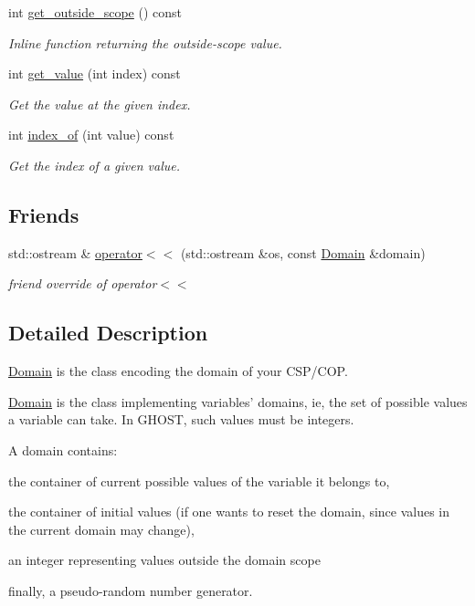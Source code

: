 \begin{DoxyCompactItemize}
int \hyperlink{classghost_1_1Domain_aaf4831cb947caf490c6133343cd3e569}{get\-\_\-outside\-\_\-scope} () const 
\begin{DoxyCompactList}\small\item\em Inline function returning the outside-\/scope value. \end{DoxyCompactList}\item 
int \hyperlink{classghost_1_1Domain_a6e50fc11a5ed2857fccb69f12c0fa07d}{get\-\_\-value} (int index) const 
\begin{DoxyCompactList}\small\item\em Get the value at the given index. \end{DoxyCompactList}\item 
int \hyperlink{classghost_1_1Domain_a1201d3b7c15381d19510a131d8823ff0}{index\-\_\-of} (int value) const 
\begin{DoxyCompactList}\small\item\em Get the index of a given value. \end{DoxyCompactList}\end{DoxyCompactItemize}
\subsection*{Friends}
\begin{DoxyCompactItemize}
\item 
std\-::ostream \& \hyperlink{classghost_1_1Domain_a1d679b36c8b64bf39dc77d69d2349b7f}{operator$<$$<$} (std\-::ostream \&os, const \hyperlink{classghost_1_1Domain}{Domain} \&domain)
\begin{DoxyCompactList}\small\item\em friend override of operator$<$$<$ \end{DoxyCompactList}\end{DoxyCompactItemize}


\subsection{Detailed Description}
\hyperlink{classghost_1_1Domain}{Domain} is the class encoding the domain of your C\-S\-P/\-C\-O\-P. 

\hyperlink{classghost_1_1Domain}{Domain} is the class implementing variables' domains, ie, the set of possible values a variable can take. In G\-H\-O\-S\-T, such values must be integers.

A domain contains\-:
\begin{DoxyEnumerate}
\item the container of current possible values of the variable it belongs to,
\item the container of initial values (if one wants to reset the domain, since values in the current domain may change),
\item an integer representing values outside the domain scope
\item finally, a pseudo-\/random number generator. 
\end{DoxyEnumerate}

